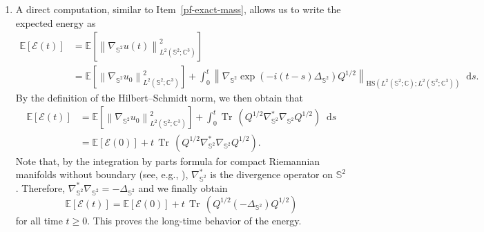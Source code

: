 \documentclass[11pt]{amsart}
\newcommand{\IC}{\mathbb{C}}
\newcommand{\E}{{\mathbb E}}
\newcommand{\IS}{\mathbb{S}}
\newcommand{\tr}{{\operatorname{Tr}\, }}
\newcommand{\cE}{\mathcal E}
\newcommand{\HS}{\mathrm{HS}}
\providecommand{\norm}[1]{\left\lVert#1\right\rVert}
\newcommand*\dd{\mathop{}\!\mathrm{d}}
\newcommand{\expp}[1]{\exp\left(#1\right)}
\newcommand{\Deltalb}{\Delta_{\IS^2}}
\newcommand{\nablalb}{\nabla_{\IS^{2}}}
\begin{document}
\begin{appendixproof}
\begin{enumerate}[label=\roman*)]
    This proves the long-time behavior of the mass.
    \item A direct computation, similar to Item~\ref{pf-exact-mass}, allows us to write the expected energy as
    \begin{align*}
        \E\left[\cE(t)\right] &=\E\left[\norm{\nablalb u(t)}_{L^2(\IS^2; \IC^3)}^2\right] \\
         &= \E\left[\norm{\nablalb u_0}^2_{{L^2(\IS^2; \IC^3)}}\right] + \int_{0}^{t} \norm{\nablalb \expp{-i(t-s)\Deltalb}Q^{1/2}}_{\HS({L^2(\IS^2; \IC)}; {L^2(\IS^2; \IC^3)})} \dd s.
    \end{align*}
    By the definition of the Hilbert--Schmidt norm, we then obtain that
    \begin{align*}
        \E\left[\cE(t)\right] &= \E\left[\norm{\nablalb u_0}^2_{{L^2(\IS^2; \IC^3)}}\right] + \int_{0}^{t}\tr\left(Q^{1/2} \nablalb^\ast \nablalb Q^{1/2}\right)\dd s\\
        & = \E\left[\cE(0)\right] + t\,\tr\left(Q^{1/2} \nablalb^\ast \nablalb Q^{1/2}\right).
    \end{align*}
    Note that, by the integration by parts formula for compact Riemannian manifolds without boundary (see, e.g., \cite[Chapter 2]{leeIntroductionRiemannianManifolds2018}), $\nablalb^\ast$ is the divergence operator on $\IS^2$. Therefore, $\nablalb^\ast \nablalb = - \Deltalb$ and we finally obtain
    \begin{equation*}
        \E\left[\cE(t)\right] = \E\left[\cE(0)\right] + t\,\tr\left(Q^{1/2} (-\Deltalb) Q^{1/2}\right)
    \end{equation*}
    for all time $t\geq0$. This proves the long-time behavior of the energy.


\end{enumerate}
\end{appendixproof}
\end{document}
